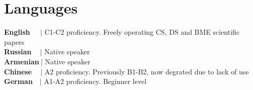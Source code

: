 \section{Languages}
\resumeSubHeadingListStart      
\resumeProjectHeading
    {\textbf{English} $\> \> \> \> \>  |$ {C1-C2 proficiency. Freely operating CS, DS and BME scientific papers}}{}\\
\resumeProjectHeading
    {\textbf{Russian} $\> \> \> \> |$ {Native speaker}}{}\\
\resumeProjectHeading
    {\textbf{Armenian}$\> |$ {Native speaker}}{}\\
\resumeProjectHeading
    {\textbf{Chinese} $\> \> \> \> |$ {A2 proficiency. Previously B1-B2, now degrated due to lack of use}}{}\\
\resumeProjectHeading
    {\textbf{German}  $\> \> \> |$ {A1-A2 proficiency. Beginner level}}{}\\
\resumeSubHeadingListEnd

